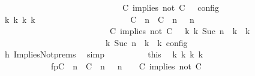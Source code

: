 \begin{isabellebody}
\ \ \ \ \ \ \ \ \ \ \ \ \ \ \ \ \ \ \ \ \ \ \ \ \ \ {\isasymturnstile}\ {\isasymPsi}\ {\isasymtriangleright}\ {\isacharparenleft}{\isacharparenleft}C\ implies\ not\ C\ {\isacharhash}\ {\isasymPhi}{\isacharparenright}\ {\isasymrbrakk}\isactrlsub c\isactrlsub o\isactrlsub n\isactrlsub f\isactrlsub i\isactrlsub g{\isacartoucheclose}\isanewline
\ \ \ \ \ \ \ \ \isamarkupfalse%
\ \isamarkupfalse%
\ {\isacartoucheopen}{\isasymexists}{\isasymGamma}\isactrlsub k\ {\isasymPsi}\isactrlsub k\ {\isasymPhi}\isactrlsub k\ k{\isachardot}\ {\isacharparenleft}\isanewline
\ \ \ \ \ \ \ \ \ \ \ \ \ \ \ \ \ \ \ \ \ {\isacharparenleft}{\isacharparenleft}{\isacharparenleft}C\ {\isasymUp}\ n{\isacharparenright}\ {\isacharhash}\ {\isacharparenleft}C\ {\isasymnot}{\isasymUp}\ n{\isacharparenright}\ {\isacharhash}\ {\isasymGamma}{\isacharparenright}{\isacharcomma}\ n\isanewline
\ \ \ \ \ \ \ \ \ \ \ \ \ \ \ \ \ \ \ \ \ \ \ {\isasymturnstile}\ {\isasymPsi}\ {\isasymtriangleright}\ {\isacharparenleft}{\isacharparenleft}C\ implies\ not\ C\ {\isacharhash}\ {\isasymPhi}{\isacharparenright}{\isacharparenright}\ {\isasymhookrightarrow}\isactrlbsup k\isactrlesup \ {\isacharparenleft}{\isasymGamma}\isactrlsub k{\isacharcomma}\ Suc\ n\ {\isasymturnstile}\ {\isasymPsi}\isactrlsub k\ {\isasymtriangleright}\ {\isasymPhi}\isactrlsub k{\isacharparenright}\isanewline
\ \ \ \ \ \ \ \ \ \ \ \ \ \ \ \ \ \ \ \ {\isacharparenright}\ {\isasymand}\ {\isasymrho}\ {\isasymin}\ {\isasymlbrakk}\ {\isasymGamma}\isactrlsub k{\isacharcomma}\ Suc\ n\ {\isasymturnstile}\ {\isasymPsi}\isactrlsub k\ {\isasymtriangleright}\ {\isasymPhi}\isactrlsub k\ {\isasymrbrakk}\isactrlsub c\isactrlsub o\isactrlsub n\isactrlsub f\isactrlsub i\isactrlsub g{\isacartoucheclose}\isanewline
\ \ \ \ \ \ \ \ \ \ \isamarkupfalse%
\ h{}\ ImpliesNot{\isachardot}prems\ \isamarkupfalse%
\ simp\isanewline
\ \ \ \ \ \ \ \ \isamarkupfalse%
\ this\ \isamarkupfalse%
\ {\isasymGamma}\isactrlsub k\ {\isasymPsi}\isactrlsub k\ {\isasymPhi}\isactrlsub k\ k\ \isanewline
\ \ \ \ \ \ \ \ \ \ \ \ fp{\isacharcolon}{\isacartoucheopen}{\isacharparenleft}{\isacharparenleft}{\isacharparenleft}C\ {\isasymUp}\ n{\isacharparenright}\ {\isacharhash}\ {\isacharparenleft}C\ {\isasymnot}{\isasymUp}\ n{\isacharparenright}\ {\isacharhash}\ {\isasymGamma}{\isacharparenright}{\isacharcomma}\ n\ {\isasymturnstile}\ {\isasymPsi}\ {\isasymtriangleright}\ {\isacharparenleft}{\isacharparenleft}C\ implies\ not\ C\ {\isacharhash}\ {\isasymPhi}{\isacharparenright}{\isacharparenright}\isanewline

\end{isabellebody}

